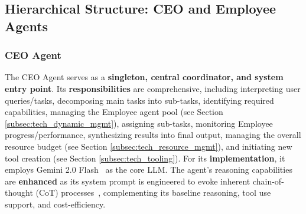 \documentclass[twocolumn]{article}
\begin{document}
\subsection{Hierarchical Structure: CEO and Employee Agents}

\subsubsection{CEO Agent}
The CEO Agent serves as a \textbf{singleton, central coordinator, and system entry point}. Its \textbf{responsibilities} are comprehensive, including interpreting user queries/tasks, decomposing main tasks into sub-tasks, identifying required capabilities, managing the Employee agent pool (see Section \ref{subsec:tech_dynamic_mgmt}), assigning sub-tasks, monitoring Employee progress/performance, synthesizing results into final output, managing the overall resource budget (see Section \ref{subsec:tech_resource_mgmt}), and initiating new tool creation (see Section \ref{subsec:tech_tooling}). For its \textbf{implementation}, it employs Gemini 2.0 Flash~\cite{gemini20flash} as the core LLM. The agent's reasoning capabilities are \textbf{enhanced} as its system prompt is engineered to evoke inherent chain-of-thought (CoT) processes~\cite{wei2022chain}, complementing its baseline reasoning, tool use support, and cost-efficiency.
\end{document}

